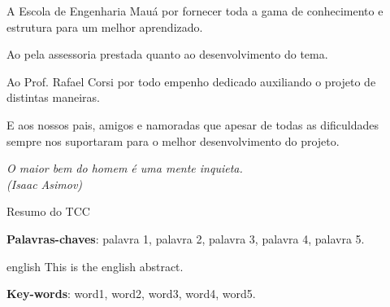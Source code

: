 \documentclass[
	12pt,				%
	openright,			%
	oneside,			%
	a4paper,			%
	english,			%
	french,				%
	spanish,			%
	brazil,				%
	oldfontcommands
	]{abntex2}
\begin{document}

\begin{agradecimentos}

A Escola de Engenharia Mauá por fornecer toda a gama de conhecimento e estrutura para um melhor aprendizado.\par
Ao {\imprimirorientador}  pela assessoria prestada quanto ao desenvolvimento do tema.\par
Ao Prof. Rafael Corsi por todo empenho dedicado auxiliando o projeto de distintas maneiras.\par
E aos nossos pais, amigos e namoradas que apesar de todas as dificuldades sempre nos suportaram para o melhor desenvolvimento do projeto.

\end{agradecimentos}

\begin{epigrafe}
    \vspace*{\fill}
	\begin{flushright}
		\textit{O maior bem do homem é uma mente inquieta.\\(Isaac Asimov)}
	\end{flushright}
\end{epigrafe}


\setlength{\absparsep}{18pt} %
\begin{resumo}
 Resumo do TCC

 \textbf{Palavras-chaves}: palavra 1, palavra 2, palavra 3, palavra 4, palavra 5.
\end{resumo}

\begin{resumo}[Abstract]
 \begin{otherlanguage*}{english}
   This is the english abstract.

   \vspace{\onelineskip}
 
   \noindent 
   \textbf{Key-words}: word1, word2, word3, word4, word5.
 \end{otherlanguage*}
\end{resumo}

\listoffigures*
\cleardoublepage

\listoftables*
\cleardoublepage
\end{document}
